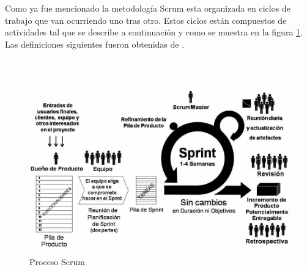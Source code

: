Como ya fue mencionado la metodología Scrum esta organizada en ciclos de trabajo que van ocurriendo uno tras otro. Estos ciclos están compuestos de actividades tal que se describe a continuación y como se muestra en la figura \ref{fig:scrum}. Las definiciones siguientes fueron obtenidas de \cite{DBLV09}.

\begin{figure}[h]
	\begin{center}
		\includegraphics[scale=0.4]{imagenes/scrum.png}
	\end{center}
	\caption{
		\label{fig:scrum}
		Proceso Scrum \cite{DBLV09}
	}
\end{figure}

